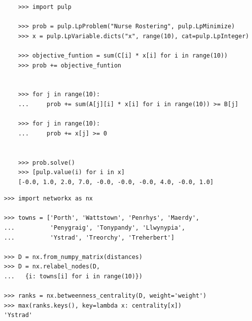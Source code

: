 \documentclass{beamer}
\begin{document}
\begin{frame}[fragile]
  \scriptsize{
  \begin{verbatim}
    >>> import pulp

    >>> prob = pulp.LpProblem("Nurse Rostering", pulp.LpMinimize)
    >>> x = pulp.LpVariable.dicts("x", range(10), cat=pulp.LpInteger)

    >>> objective_funtion = sum(C[i] * x[i] for i in range(10))
    >>> prob += objective_funtion


    >>> for j in range(10):
    ...     prob += sum(A[j][i] * x[i] for i in range(10)) >= B[j]

    >>> for j in range(10):
    ...     prob += x[j] >= 0


    >>> prob.solve()
    >>> [pulp.value(i) for i in x]
    [-0.0, 1.0, 2.0, 7.0, -0.0, -0.0, -0.0, 4.0, -0.0, 1.0]
  \end{verbatim}
  }
\end{frame}


\frame{
  \begin{center}
      
  \end{center}
}

\begin{frame}[fragile]
\small{
\begin{verbatim}
>>> import networkx as nx

>>> towns = ['Porth', 'Wattstown', 'Penrhys', 'Maerdy',
...          'Penygraig', 'Tonypandy', 'Llwynypia',
...          'Ystrad', 'Treorchy', 'Treherbert']

>>> D = nx.from_numpy_matrix(distances)
>>> D = nx.relabel_nodes(D,
...   {i: towns[i] for i in range(10)})

>>> ranks = nx.betweenness_centrality(D, weight='weight')
>>> max(ranks.keys(), key=lambda x: centrality[x])
'Ystrad'
\end{verbatim}
}
\end{frame}

\end{document}
